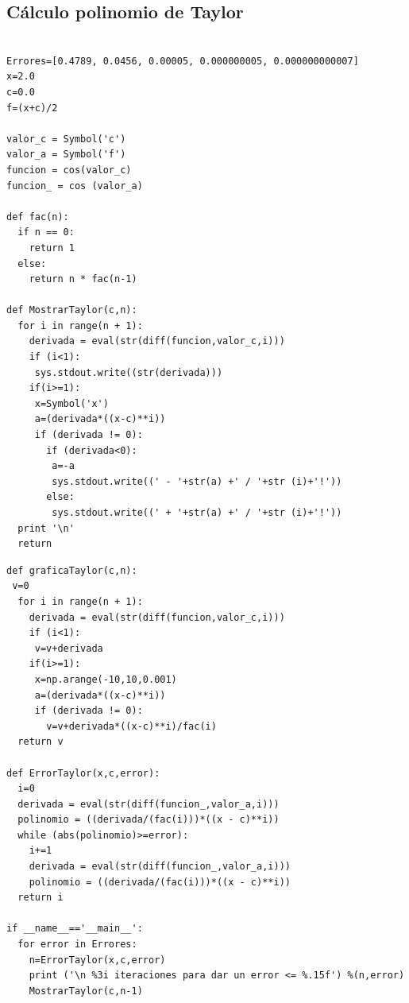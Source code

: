 \documentclass{beamer}
\begin{document}
\subsection{Cálculo polinomio de Taylor}
\label{}
\begin{frame}[fragile]
\begin{center}
\begin{tiny}
\begin{verbatim}

Errores=[0.4789, 0.0456, 0.00005, 0.000000005, 0.000000000007]
x=2.0
c=0.0
f=(x+c)/2

valor_c = Symbol('c')
valor_a = Symbol('f')
funcion = cos(valor_c)
funcion_ = cos (valor_a)

def fac(n):
  if n == 0:
    return 1
  else:
    return n * fac(n-1)

def MostrarTaylor(c,n):
  for i in range(n + 1):
    derivada = eval(str(diff(funcion,valor_c,i)))
    if (i<1):
     sys.stdout.write((str(derivada)))
    if(i>=1):
     x=Symbol('x')
     a=(derivada*((x-c)**i))
     if (derivada != 0):
       if (derivada<0):	 
        a=-a
        sys.stdout.write((' - '+str(a) +' / '+str (i)+'!'))
       else: 
        sys.stdout.write((' + '+str(a) +' / '+str (i)+'!'))
  print '\n' 
  return 
\end{verbatim}
\end{tiny}
\end{center}
\end{frame}
\begin{frame}[fragile]
\begin{center}
\begin{tiny}
\begin{verbatim}
def graficaTaylor(c,n):
 v=0
  for i in range(n + 1):
    derivada = eval(str(diff(funcion,valor_c,i)))
    if (i<1):
     v=v+derivada
    if(i>=1):
     x=np.arange(-10,10,0.001)
     a=(derivada*((x-c)**i))
     if (derivada != 0):
       v=v+derivada*((x-c)**i)/fac(i) 
  return v

def ErrorTaylor(x,c,error):
  i=0
  derivada = eval(str(diff(funcion_,valor_a,i)))
  polinomio = ((derivada/(fac(i)))*((x - c)**i))
  while (abs(polinomio)>=error):
    i+=1
    derivada = eval(str(diff(funcion_,valor_a,i)))
    polinomio = ((derivada/(fac(i)))*((x - c)**i))
  return i

if __name__=='__main__':
  for error in Errores:
    n=ErrorTaylor(x,c,error)
    print ('\n %3i iteraciones para dar un error <= %.15f') %(n,error)
    MostrarTaylor(c,n-1)
    
    
\end{verbatim}
\end{tiny}
\end{center}
\end{frame}
\end{document}
